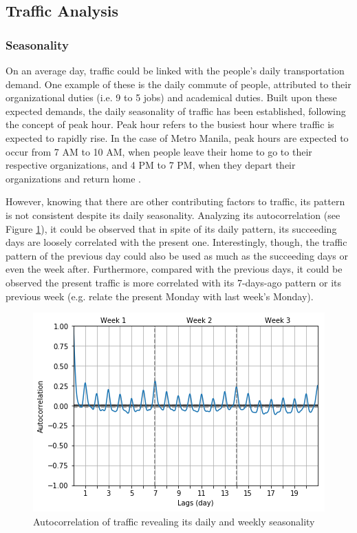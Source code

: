 \subsection{Traffic Analysis}

\subsubsection{Seasonality}

On an average day, traffic could be linked with the people's daily transportation demand. One example of these is the daily commute of people, attributed to their organizational duties (i.e. 9 to 5 jobs) and academical duties. Built upon these expected demands, the daily seasonality of traffic has been established, following the concept of peak hour. Peak hour refers to the busiest hour where traffic is expected to rapidly rise. In the case of Metro Manila, peak hours are expected to occur from 7 AM to 10 AM, when people leave their home to go to their respective organizations, and 4 PM to 7 PM, when they depart their organizations and return home \cite{metro_manila_peak_hour}.

However, knowing that there are other contributing factors to traffic, its pattern is not consistent despite its daily seasonality. Analyzing its autocorrelation (see Figure \ref{figure_autocorr_traffic_week}), it could be observed that in spite of its daily pattern, its succeeding days are loosely correlated with the present one. Interestingly, though, the traffic pattern of the previous day could also be used as much as the succeeding days or even the week after. Furthermore, compared with the previous days, it could be observed the present traffic is more correlated with its 7-days-ago pattern or its previous week (e.g. relate the present Monday with last week's Monday).
    
    
\begin{figure}
  \includegraphics[width=\linewidth]{figures/figure_autocorr_traffic_week.png}
  \caption{Autocorrelation of traffic revealing its daily and weekly seasonality}
  \label{figure_autocorr_traffic_week}
\end{figure}



